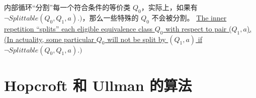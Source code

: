 内部循环“分割”每一个符合条件的等价类 $Q_0$，实际上，如果有$\neg Splittable(Q_0,Q_1,a).)$，那么一些特殊的 $Q_0$ 不会被分割。
\uline{The inner repetition “splits” each eligible equivalence class $Q_0$ with respect to pair ($Q_1,a$), (In actuality, some particular $Q_0$ will not be split by $(Q_1,a)$ if $\neg Splittable(Q_0,Q_1,a).)$}

\section{Hopcroft 和 Ullman 的算法 }

